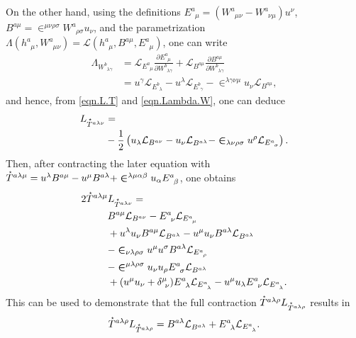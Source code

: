 \documentclass[
10pt, %
a4paper, %
oneside, %
twocolumn,
headinclude,footinclude, %
BCOR5mm, %
]{scrartcl}
\newcommand{\tetrsymbol}{h}
\newcommand{\tetr}[2]{\tetrsymbol^{#1}_{\phantom{#1}#2}}
\newcommand{\ET}[2]{E^{#1}_{\phantom{#1}#2}}	%
\newcommand{\BT}[2]{B^{#1#2}}	%
\newcommand{\w}[2]{W^{#1}_{\phantom{#1}#2}}
\newcommand{\Lag}{\Lambda}	%
\newcommand{\Laghodge}{L}%
\newcommand{\LagBE}{\mathcal{L}}%
\newcommand{\LCsymb}{\bm{\in}}    %
\newcommand{\HDT}[1]{\accentset{\star}{T}^{#1}}
\newcommand{\KD}[2]{\delta^{#1}_{\ #2}}
\begin{document}
	On the other hand, using the definitions $ \ET{a}{\mu} = (\w{a}{\mu\nu} - \w{a}{\nu\mu})u^\nu 
	$, $ 
	\BT{a}{\mu} = \LCsymb^{\mu\nu\rho\sigma}\w{a}{\rho\sigma} u_\nu $, and  the parametrization $ 
	\Lag(\tetr{a}{\mu},\w{a}{\mu\nu}) = \LagBE(\tetr{a}{\mu},\BT{a}{\mu},\ET{a}{\mu}) $, one can 
	write
	\begin{align}\label{eqn.Lambda.W}
		\Lag_{\w{b}{\lambda\gamma}} &= 
		\LagBE_{\ET{a}{\mu}} \frac{\partial \ET{a}{\mu}}{\partial \w{b}{\lambda\gamma}} 
		+
		\LagBE_{\BT{a}{\mu}} \frac{\partial \BT{a}{\mu}}{\partial \w{b}{\lambda\gamma}} 
		\nonumber\\
		&=
		u^\gamma \LagBE_{\ET{b}{\lambda}} - u^\lambda \LagBE_{\ET{b}{\gamma}} - 
		\LCsymb^{\lambda\gamma\nu\mu} u_\nu \LagBE_{\BT{a}{\mu}},
	\end{align}
	and hence, from \eqref{eqn.L.T} and \eqref{eqn.Lambda.W}, one can deduce 
	\begin{align}
		\Laghodge_{\HDT{a\lambda\nu}} &= \nonumber\\
		&-\frac{1}{2} 
		\left(
		u_\lambda \LagBE_{\BT{a}{\nu}} - u_\nu \LagBE_{\BT{a}{\lambda}} 
		-
		\LCsymb_{\lambda\nu\rho\sigma} u^\rho \LagBE_{\ET{a}{\sigma}} 
		\right).
	\end{align}
	Then, after contracting the later equation with $ \HDT{a\lambda\mu} = u^\lambda \BT{a}{\mu} - 
	u^\mu 
	\BT{a}{\lambda} + \LCsymb^{\lambda\mu\alpha\beta} u_\alpha \ET{a}{\beta} $, one obtains
	\begin{align}\label{eqn.T.L.T} 
		2 \HDT{a\lambda\mu} &\Laghodge_{\HDT{a\lambda\nu}}  = \nonumber\\
		&  \BT{a}{\mu}\LagBE_{\BT{a}{\nu}} 
		- \ET{a}{\nu}\LagBE_{\ET{a}{\mu}} \nonumber\\
		& + u^\lambda u_\nu \BT{a}{\mu} \LagBE_{\BT{a}{\lambda}} - u^\mu u_\nu \BT{a}{\lambda} 
		\LagBE_{\BT{a}{\lambda}}				\nonumber\\
		& - \LCsymb_{\nu\lambda\rho\sigma} u^\mu u^\sigma \BT{a}{\lambda} \LagBE_{\ET{a}{\rho}} 
		\nonumber\\
		& - \LCsymb^{\mu\lambda\rho\sigma} u_\nu u_\rho \ET{a}{\sigma} \LagBE_{\BT{a}{\lambda}}
		\nonumber \\
		& + (u^\mu u_\nu + \KD{\mu}{\nu}) \ET{a}{\lambda} \LagBE_{\ET{a}{\lambda}} - u^\mu 
		u_\lambda 
		\ET{a}{\nu} \LagBE_{\ET{a}{\lambda}}.
	\end{align}
	This can be used to demonstrate that the full contraction  $ 	\HDT{a\lambda\rho} 
	\Laghodge_{\HDT{a\lambda\rho}} $ results in
	\begin{equation}\label{eqn.T.L.T.full}
		\HDT{a\lambda\rho} \Laghodge_{\HDT{a\lambda\rho}}
		=
		\BT{a}{\lambda} \LagBE_{\BT{a}{\lambda}} + \ET{a}{\lambda} \LagBE_{\ET{a}{\lambda}}.
	\end{equation}
	
\end{document}
